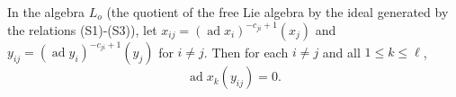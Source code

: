 In the algebra $L_o$ (the quotient of the free Lie algebra by the ideal generated by the relations (S1)-(S3)), let $x_{ij} = (\operatorname{ad} x_i)^{-c_{ji}+1}(x_j)$ and $y_{ij} = (\operatorname{ad} y_i)^{-c_{ji}+1}(y_j)$ for $i \neq j$. Then for each $i \neq j$ and all $1 \leq k \leq \ell$,
$$\operatorname{ad} x_k(y_{ij}) = 0.$$
